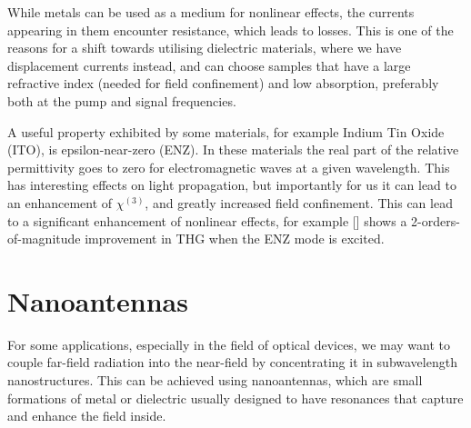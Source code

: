\documentclass[12pt,a4paper]{article}
\newcommand{\citein}[1]{[\citen{#1}]}
\begin{document}
While metals can be used as a medium for nonlinear effects, the currents appearing in them encounter resistance, which leads to losses. This is one of the reasons for a shift towards  utilising dielectric materials, where we have displacement currents instead\cite{krasnokAlldielectricOpticalNanoantennas2012,vandegroepDesigningDielectricResonators2013}, and can choose samples that have a large refractive index (needed for field confinement) and low absorption, preferably both at the pump and signal frequencies.

A useful property exhibited by some materials, for example Indium Tin Oxide (ITO), is epsilon-near-zero (ENZ). In these materials the real part of the relative permittivity goes to zero for electromagnetic waves at a given wavelength. This has interesting effects on light propagation, but importantly for us it can lead to an enhancement of $\chi^{(3)}$, and greatly increased field confinement\cite{reshefNonlinearOpticalEffects2019}. This can lead to a significant enhancement of nonlinear effects, for example \citein{lukEnhancedThirdHarmonic2015a} shows a 2-orders-of-magnitude improvement in THG when the ENZ mode is excited.

\section{Nanoantennas}
For some applications, especially in the field of optical devices,
we may want to couple far-field radiation into the near-field by concentrating it in subwavelength nanostructures. This can be achieved using nanoantennas, which are small formations of metal or dielectric usually designed to have resonances that capture and enhance the field inside\cite{krasnokAlldielectricOpticalNanoantennas2012}.
\end{document}
